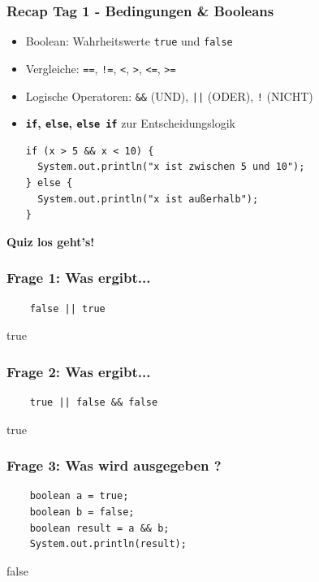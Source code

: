 \documentclass{../../presentation}
\begin{document}
\begin{frame}[fragile]
	\frametitle{Recap Tag 1 - Bedingungen \& Booleans}

	\begin{itemize}
		\item\pause Boolean: Wahrheitswerte \texttt{true} und \texttt{false}
		\item\pause Vergleiche: \texttt{==}, \texttt{!=}, \texttt{<}, \texttt{>}, \texttt{<=}, \texttt{>=}
		\item\pause Logische Operatoren: \texttt{\&\&} (UND), \texttt{||} (ODER), \texttt{!} (NICHT)
		\item\pause \textbf{\texttt{if}, \texttt{else}, \texttt{else if}} zur Entscheidungslogik
		      \begin{verbatim}
if (x > 5 && x < 10) {
  System.out.println("x ist zwischen 5 und 10");
} else {
  System.out.println("x ist außerhalb");
}
          \end{verbatim}
	\end{itemize}
\end{frame}

\begin{frame}[plain]
	\centering
	{\Huge\bfseries{Quiz los geht's!}}
\end{frame}

\begin{frame}[fragile]
	\frametitle{Frage 1: Was ergibt...}
	\begin{verbatim}
    false || true
  \end{verbatim}
	\pause
	\begin{ausgabe}
		true
	\end{ausgabe}
\end{frame}

\begin{frame}[fragile]
	\frametitle{Frage 2: Was ergibt...}
	\begin{verbatim}
    true || false && false
  \end{verbatim}
	\pause
	\begin{ausgabe}
		true
	\end{ausgabe}
\end{frame}

\begin{frame}[fragile]
	\frametitle{Frage 3: Was wird ausgegeben ?}
	\begin{verbatim}
    boolean a = true;
    boolean b = false;
    boolean result = a && b;
    System.out.println(result);
  \end{verbatim}
	\pause
	\begin{ausgabe}
		false
	\end{ausgabe}
\end{frame}
\end{document}
